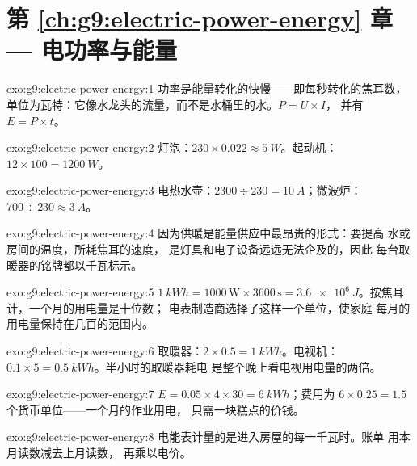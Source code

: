 \section*{第 \ref{ch:g9:electric-power-energy} 章 --- 电功率与能量}

\begin{solution}{exo:g9:electric-power-energy:1}
功率是能量转化的快慢——即每秒转化的焦耳数，
单位为瓦特：它像水龙头的流量，而不是水桶里的水。$P = U \times I$，
并有 $E = P \times t$。
\end{solution}

\begin{solution}{exo:g9:electric-power-energy:2}
灯泡：$230 \times 0.022 \approx \qty{5}{W}$。起动机：$12
\times 100 = \qty{1200}{W}$。
\end{solution}

\begin{solution}{exo:g9:electric-power-energy:3}
电热水壶：$2300 \div 230 = \qty{10}{A}$；微波炉：$700 \div
230 \approx \qty{3}{A}$。
\end{solution}

\begin{solution}{exo:g9:electric-power-energy:4}
因为供暖是能量供应中最昂贵的形式：要提高
水或房间的温度，所耗焦耳的速度，
是灯具和电子设备远远无法企及的，因此
每台取暖器的铭牌都以千瓦标示。
\end{solution}

\begin{solution}{exo:g9:electric-power-energy:5}
$\qty{1}{kWh} = 1000 \, \text{W} \times 3600 \, \text{s} =
\qty{3.6e6}{J}$。按焦耳计，一个月的用电量是十位数；
电表制造商选择了这样一个单位，使家庭
每月的用电量保持在几百的范围内。
\end{solution}

\begin{solution}{exo:g9:electric-power-energy:6}
取暖器：$2 \times 0.5 = \qty{1}{kWh}$。电视机：$0.1
\times 5 = \qty{0.5}{kWh}$。半小时的取暖器耗电
是整个晚上看电视用电量的两倍。
\end{solution}

\begin{solution}{exo:g9:electric-power-energy:7}
$E = 0.05 \times 4 \times 30 = \qty{6}{kWh}$；费用为 $6 \times
0.25 = 1.5$ 个货币单位——一个月的作业用电，
只需一块糕点的价钱。
\end{solution}

\begin{solution}{exo:g9:electric-power-energy:8}
电能表计量的是进入房屋的每一千瓦时。账单
用本月读数减去上月读数，
再乘以电价。
\end{solution}


